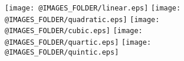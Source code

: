 \documentclass[10pt]{article}
\begin{document}
\def \fgw {1.5in}
    \begin{figure}[h!]
        \centerline {
            \texttt{[image: @IMAGES\_FOLDER/linear.eps]}
            \texttt{[image: @IMAGES\_FOLDER/quadratic.eps]}
            \texttt{[image: @IMAGES\_FOLDER/cubic.eps]}
            \texttt{[image: @IMAGES\_FOLDER/quartic.eps]}
            \texttt{[image: @IMAGES\_FOLDER/quintic.eps]}
        }
    \end{figure}
\end{document}
